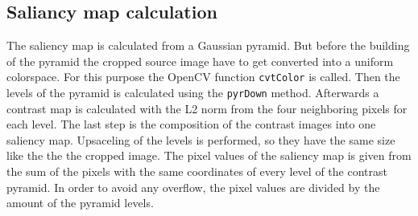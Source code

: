 \documentclass[draft,final]{vutinfth} %
\begin{document}
	\subsection{Saliancy map calculation}
	The saliency map is calculated from a Gaussian pyramid.
	But before the building of the pyramid the cropped source image have to get converted into a uniform colorspace.
	For this purpose the OpenCV function \texttt{cvtColor} is called.
	Then the levels of the pyramid is calculated using the \texttt{pyrDown} method.
	Afterwards a contrast map is calculated with the L2 norm from the four neighboring pixels for each level.
	The last step is the composition of the contrast images into one saliency map.
	Upsaceling of the levels is performed, so they have the same size like the the the cropped image.
	The pixel values of the saliency map is given from the sum of the pixels with the same coordinates of every level of the contrast pyramid. 
	In order to avoid any overflow, the pixel values are divided by the amount of the pyramid levels.
	
\end{document}
